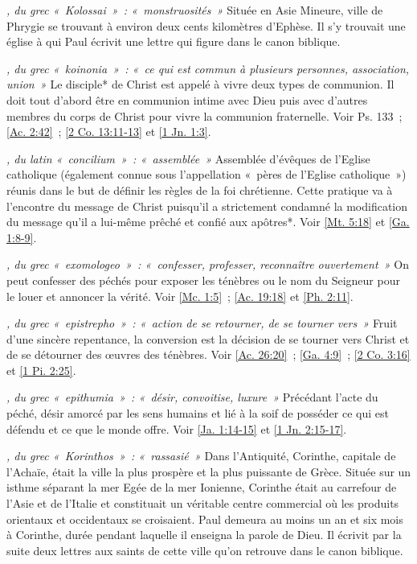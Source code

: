 \begin{multicols}{2}
\textit{, du grec «~Kolossai~»~: «~monstruosités~»}\newline
Située en Asie Mineure, ville de Phrygie se trouvant à environ deux cents kilomètres d'Ephèse. Il s'y trouvait une église à qui Paul écrivit une lettre qui figure dans le canon biblique.

\textit{, du grec «~koinonia~»~: «~ce qui est commun à plusieurs personnes, association, union~»}\newline
Le disciple* de Christ est appelé à vivre deux types de communion. Il doit tout d'abord être en communion intime avec Dieu puis avec d'autres membres du corps de Christ pour vivre la communion fraternelle. Voir Ps. 133~; \vref{Ac. 2:42}~; \vref{2 Co. 13:11-13} et \vref{1 Jn. 1:3}.

\textit{, du latin «~concilium~»~: «~assemblée~»}\newline
Assemblée d'évêques de l'Eglise catholique (également connue sous l'appellation «~pères de l'Eglise catholique~») réunis dans le but de définir les règles de la foi chrétienne. Cette pratique va à l'encontre du message de Christ puisqu'il a strictement condamné la modification du message qu'il a lui-même prêché et confié aux apôtres*. Voir \vref{Mt. 5:18} et \vref{Ga. 1:8-9}.

\textit{, du grec «~exomologeo~»~: «~confesser, professer, reconnaître ouvertement~»}\newline
On peut confesser des péchés pour exposer les ténèbres ou le nom du Seigneur pour le louer et annoncer la vérité. Voir \vref{Mc. 1:5}~; \vref{Ac. 19:18} et \vref{Ph. 2:11}.

\textit{, du grec «~epistrepho~»~: «~action de se retourner, de se tourner vers~»}\newline
Fruit d'une sincère repentance, la conversion est la décision de se tourner vers Christ et de se détourner des œuvres des ténèbres. Voir \vref{Ac. 26:20}~; \vref{Ga. 4:9}~; \vref{2 Co. 3:16} et \vref{1 Pi. 2:25}.

\textit{, du grec «~epithumia~»~: «~désir, convoitise, luxure~»}\newline
Précédant l'acte du péché, désir amorcé par les sens humains et lié à la soif de posséder ce qui est défendu et ce que le monde offre. Voir \vref{Ja. 1:14-15} et \vref{1 Jn. 2:15-17}.

\textit{, du grec «~Korinthos~»~: «~rassasié~»}\newline
Dans l'Antiquité, Corinthe, capitale de l'Achaïe, était la ville la plus prospère et la plus puissante de Grèce. Située sur un isthme séparant la mer Egée de la mer Ionienne, Corinthe était au carrefour de l'Asie et de l'Italie et constituait un véritable centre commercial où les produits orientaux et occidentaux se croisaient. Paul demeura au moins un an et six mois à Corinthe, durée pendant laquelle il enseigna la parole de Dieu. Il écrivit par la suite deux lettres aux saints de cette ville qu'on retrouve dans le canon biblique.


\end{multicols}
